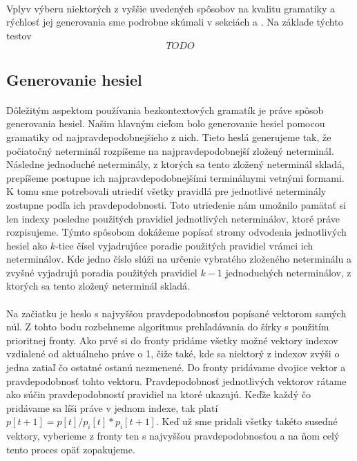 \paragraph{}
Vplyv výberu niektorých z vyššie uvedených spôsobov na kvalitu gramatiky a rýchlosť jej generovania sme podrobne skúmali v sekciách \label{sec:time} a \label{sec:pass}. Na základe týchto testov \[TODO\]

\subsection{Generovanie hesiel}
\paragraph{}
Dôležitým aspektom používania bezkontextových gramatík je práve spôsob generovania hesiel. Našim hlavným cieľom bolo generovanie hesiel pomocou gramatiky od najpravdepodobnejšieho z nich. Tieto heslá generujeme tak, že počiatočný neterminál rozpíšeme na najpravdepodobnejší zložený neterminál. Následne jednoduché neterminály, z ktorých sa tento zložený neterminál skladá, prepíšeme postupne ich najpravdepodobnejšími terminálnymi vetnými formami. K tomu sme potrebovali utriediť všetky pravidlá pre jednotlivé neterminály zostupne podľa ich pravdepodobnosti. Toto utriedenie nám umožnilo pamätať si len indexy posledne použitých pravidiel jednotlivých neterminálov, ktoré práve rozpisujeme. Týmto spôsobom dokážeme popísať stromy odvodenia jednotlivých hesiel ako \(k\)-tice čísel vyjadrujúce poradie použitých pravidiel vrámci ich neterminálov. Kde jedno číslo slúži na určenie vybratého zloženého neterminálu a zvyšné vyjadrujú poradia použitých pravidiel \(k-1\) jednoduchých neterminálov, z ktorých sa tento zložený neterminál skladá.
\paragraph{}
Na začiatku je heslo s najvyššou pravdepodobnosťou popísané vektorom samých núl. Z tohto bodu rozbehneme algoritmus prehľadávania do šírky s použitím prioritnej fronty. Ako prvé si do fronty pridáme všetky možné vektory indexov vzdialené od aktuálneho práve o 1, čiže také, kde sa niektorý z indexov zvýši o jedna zatiaľ čo ostatné ostanú nezmenené. Do fronty pridávame dvojice vektor a pravdepodobnosť tohto vektoru. Pravdepodobnosť jednotlivých vektorov rátame ako súčin pravdepodobností pravidiel na ktoré ukazujú. Keďže každý čo pridávame sa líši práve v jednom indexe, tak platí \(p[t+1] = p[t] / p_i[t] * p_i[t+1]\). Keď už sme pridali všetky takéto susedné vektory, vyberieme z fronty ten s najvyššou pravdepodobnosťou a na ňom celý tento proces opäť zopakujeme.
